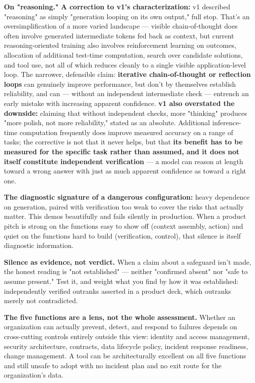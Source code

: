 \textbf{On "reasoning."} \textbf{A correction to v1's characterization:} v1 described "reasoning" as simply "generation looping on its own output," full stop. That's an oversimplification of a more varied landscape --- visible chain-of-thought does often involve generated intermediate tokens fed back as context, but current reasoning-oriented training also involves reinforcement learning on outcomes, allocation of additional test-time computation, search over candidate solutions, and tool use, not all of which reduces cleanly to a single visible application-level loop. The narrower, defensible claim: \textbf{iterative chain-of-thought or reflection loops} can genuinely improve performance, but don't by themselves establish reliability, and can --- without an independent intermediate check --- entrench an early mistake with increasing apparent confidence. \textbf{v1 also overstated the downside:} claiming that without independent checks, more "thinking" produces "more polish, not more reliability," stated as an absolute. Additional inference-time computation frequently does improve measured accuracy on a range of tasks; the corrective is not that it never helps, but that \textbf{its benefit has to be measured for the specific task rather than assumed, and it does not itself constitute independent verification} --- a model can reason at length toward a wrong answer with just as much apparent confidence as toward a right one.

\textbf{The diagnostic signature of a dangerous configuration:} heavy dependence on generation, paired with verification too weak to cover the risks that actually matter. This demos beautifully and fails silently in production. When a product pitch is strong on the functions easy to show off (context assembly, action) and quiet on the functions hard to build (verification, control), that silence is itself diagnostic information.

\textbf{Silence as evidence, not verdict.} When a claim about a safeguard isn't made, the honest reading is "not established" --- neither "confirmed absent" nor "safe to assume present." Test it, and weight what you find by how it was established: independently verified outranks asserted in a product deck, which outranks merely not contradicted.

\textbf{The five functions are a lens, not the whole assessment.} Whether an organization can actually prevent, detect, and respond to failures depends on cross-cutting controls entirely outside this view: identity and access management, security architecture, contracts, data lifecycle policy, incident response readiness, change management. A tool can be architecturally excellent on all five functions and still unsafe to adopt with no incident plan and no exit route for the organization's data.
